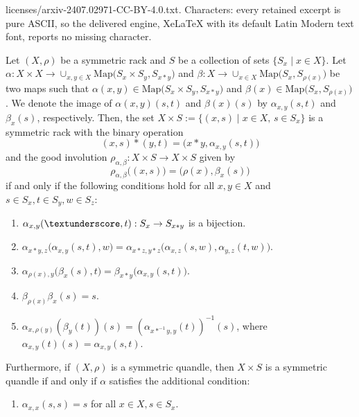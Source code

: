 \documentclass[10pt,a4paper]{amsart}
\newcommand{\Map}{\mathrm{Map}}
\begin{document}
licenses/arxiv-2407.02971-CC-BY-4.0.txt. Characters: every retained excerpt is pure ASCII, so the delivered engine, XeLaTeX with its default Latin Modern text font, reports no missing character.
\begin{proposition}\label{Dynamical cocycles for symmetric racks}
Let $(X,\rho)$ be a symmetric rack and $S$ be a collection of sets $\{S_x \mid x \in X\}$. Let $\alpha:X \times X \rightarrow \cup_{x,y \in X}\Map\big(S_x \times S_y,S_{x*y}\big)$  and $\beta:X \rightarrow \cup_{x \in X}\Map \big(S_x,S_{\rho(x)}\big)$ be two maps such that $\alpha({x,y}) \in \Map \big(S_x \times S_y, S_{x*y}\big)$ and $\beta(x) \in \Map\big(S_x,S_{\rho(x)}\big)$. We denote the image of $\alpha(x,y)(s,t)$  and $\beta(x)(s)$ by $\alpha_{x,y}(s,t)$ and $\beta_x(s)$, respectively. Then, the set $X \times S:=\{(x,s) \mid x \in X, \, s \in S_x\}$ is a symmetric rack with the binary operation
		$$(x,s)*(y,t)=\big(x*y,\alpha_{x,y}(s,t) \big)$$
		and the good involution $\rho_{\alpha,\beta}:X \times S \rightarrow X \times S$ given by
		\begin{equation*}
			\rho_{\alpha,\beta} \big((x,s) \big) = \big(\rho(x),\beta_x(s) \big)
		\end{equation*}
		if and only if the following conditions hold for all $x,y \in X$ and $s\in S_x, t \in S_y, w\in S_z$:
		\begin{enumerate}
			\item $\alpha_{x,y}(\textunderscore,t):S_x \rightarrow S_{x*y}$ is a bijection.
			\item $\alpha_{x*y,z} \big(\alpha_{x,y}(s,t),w \big)=\alpha_{x*z,y*z} \big(\alpha_{x,z}(s,w),\alpha_{y,z}(t,w) \big).$
			\item $\alpha_{\rho(x),y} \big(\beta_x(s),t \big)=\beta_{x*y} \big(\alpha_{x,y}(s,t) \big).$
			\item $\beta_{\rho(x)}\beta_x(s)=s.$
			\item $\alpha_{x,\rho(y)}(\beta_y(t))(s)=(\alpha_{x*^{-1}y,y}(t))^{-1}(s)$, where $\alpha_{x,y}(t)(s)=\alpha_{x,y}(s,t).$
		\end{enumerate}
	Furthermore, if $(X,\rho)$ is a symmetric quandle, then  $X \times S$ is a symmetric quandle if and only if $\alpha$ satisfies the additional condition: 
	\begin{enumerate}
		\item [(6)] $\alpha_{x,x}(s,s)=s$ for all $x \in X, s \in S_x.$
	\end{enumerate}
	
	\end{proposition}
\end{document}
